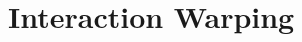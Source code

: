 \documentclass{article}
\DeclareMathOperator*{\argmin}{arg\,min}
\newcommand{\pcx}[1]{\mathrm{X}^{(#1)}}
\newcommand{\wxy}[2]{W_{#1 \rightarrow #2}}
\newcommand{\pci}{\pcx{i}}
\newcommand{\pcj}{\pcx{j}}
\newcommand{\pcc}{\pcx{C}}
\newcommand{\wij}{\wxy{i}{j}}
\newcommand{\wci}{\wxy{C}{i}}
\begin{document}



\section{Interaction Warping}
\end{document}
